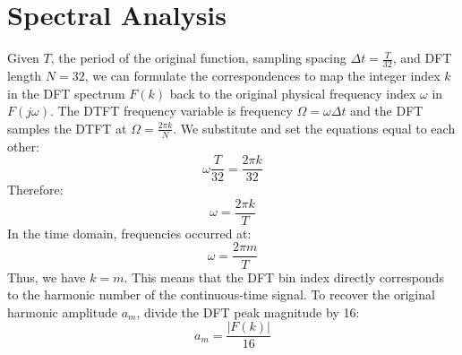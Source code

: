 \documentclass{article}
\begin{document}
\section{Spectral Analysis}
Given \(T\), the period of the original function, sampling spacing \(\Delta t = \frac{T}{32}\), and DFT length \(N=32\), we can formulate the correspondences to map the integer index \(k\) in the DFT spectrum \(F(k)\) back to the original physical frequency index \(\omega\) in \(F(j\omega)\). The DTFT frequency variable is frequency \(\Omega = \omega \Delta t\) and the DFT samples the DTFT at  \(\Omega = \frac{2\pi k}{N}\). We substitute and set the equations equal to each other:
\[
\omega\frac{T}{32} = \frac{2\pi k}{32}
\]
Therefore:
\[
\omega = \frac{2\pi k}{T}
\]
In the time domain, frequencies occurred at:
\[
\omega = \frac{2\pi m}{T}
\]
Thus, we have \(k = m\).
This means that the DFT bin index directly corresponds to the harmonic number of the continuous-time signal. 
To recover the original harmonic amplitude \(a_m\), divide the DFT peak magnitude by 16:
\[
a_m = \frac{|F(k)|}{16}
\] 
\end{document}
